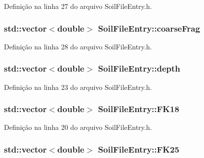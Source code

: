 Definição na linha 27 do arquivo Soil\+File\+Entry.\+h.

\subsubsection[{coarse\+Frag}]{\setlength{\rightskip}{0pt plus 5cm}std\+::vector$<$double$>$ Soil\+File\+Entry\+::coarse\+Frag\hspace{0.3cm}{\ttfamily [protected]}}\label{class_soil_file_entry_a5ca20da03170318b4c82509b654386fa}


Definição na linha 28 do arquivo Soil\+File\+Entry.\+h.

\subsubsection[{depth}]{\setlength{\rightskip}{0pt plus 5cm}std\+::vector$<$double$>$ Soil\+File\+Entry\+::depth\hspace{0.3cm}{\ttfamily [protected]}}\label{class_soil_file_entry_a94600de5cb38b5c645a8dcd3445c751c}


Definição na linha 23 do arquivo Soil\+File\+Entry.\+h.

\subsubsection[{F\+K18}]{\setlength{\rightskip}{0pt plus 5cm}std\+::vector$<$double$>$ Soil\+File\+Entry\+::\+F\+K18\hspace{0.3cm}{\ttfamily [protected]}}\label{class_soil_file_entry_add276a190add8be8edf358743ca3987d}


Definição na linha 20 do arquivo Soil\+File\+Entry.\+h.

\subsubsection[{F\+K25}]{\setlength{\rightskip}{0pt plus 5cm}std\+::vector$<$double$>$ Soil\+File\+Entry\+::\+F\+K25\hspace{0.3cm}{\ttfamily [protected]}}\label{class_soil_file_entry_a1679a0f9daccb1408ca931457427a157}


